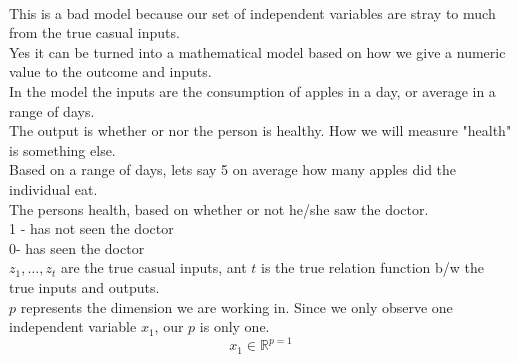\documentclass[12pt]{article}
\begin{document}

\begin{enumerate}

\\This is a bad model because our set of independent variables are stray to much from the true casual inputs.
\\Yes it can be turned into a mathematical model based on how we give a numeric value to the outcome and inputs.
\\In the model the inputs are the consumption of apples in a day, or average in a range of days.
\\The output is whether or nor the person is healthy. How we will measure "health" is something else. 
\\Based on a range of days, lets say 5 on average how many apples did the individual eat.
\\The persons health, based on whether or not he/she saw the doctor.
\\1 - has not seen the doctor
\\0- has seen the doctor
\\$z_1, \ldots, z_t$ are the true casual inputs, ant $t$ is the true relation function b/w the  true inputs and outputs.
\\$p$ represents the dimension we are working in. Since we only observe one independent variable $x_1$, our $p$ is only one. $$x_1 \in \mathbb{R}^{p = 1}$$


\end{enumerate}
\end{document}
